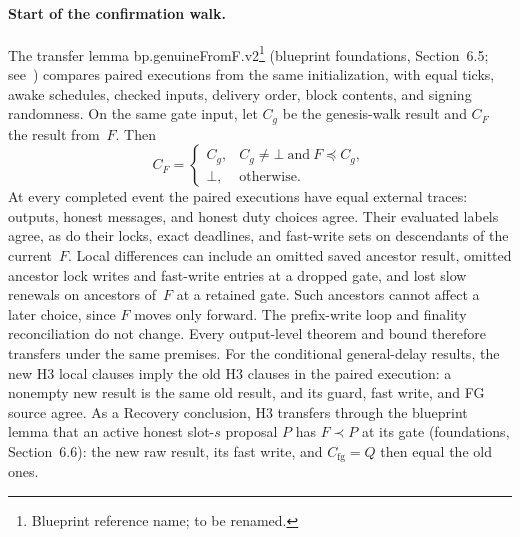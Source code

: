 \documentclass{article}
\theoremstyle{plain}
\theoremstyle{definition}
\theoremstyle{remark}
\begin{document}
\paragraph{Start of the confirmation walk.}
The transfer lemma \textsf{bp.genuineFromF.v2}\footnote{Blueprint reference name; to be renamed.} (blueprint foundations,
Section~6.5; see~\cite{BPO,GF208,GF208R}) compares paired executions
from the same initialization, with equal ticks, awake schedules, checked
inputs, delivery order, block contents, and signing randomness.
On the same gate input, let $C_g$ be the genesis-walk result and $C_F$
the result from~$F$.  Then
\[
 C_F=\begin{cases}
 C_g,&C_g\ne\bot\ \text{and}\ F\preceq C_g,\\
 \bot,&\text{otherwise}.
 \end{cases}
\]
At every completed event the paired executions have equal external
traces: outputs, honest messages, and honest duty choices agree.
Their evaluated labels agree, as do their locks, exact deadlines,
and fast-write sets on descendants of the current~$F$.
Local differences can include an omitted saved ancestor result,
omitted ancestor lock writes and fast-write entries at a dropped gate,
and lost slow renewals on ancestors of~$F$ at a retained gate.
Such ancestors cannot affect a later choice, since $F$ moves only
forward.  The prefix-write loop and finality reconciliation do not change.
Every output-level theorem and bound therefore transfers under the same
premises.  For the conditional general-delay results, the new H3 local
clauses imply the old H3 clauses in the paired execution: a nonempty
new result is the same old result, and its guard, fast write, and FG
source agree.  As a Recovery conclusion, H3 transfers through the
blueprint lemma that an active honest slot-$s$ proposal $P$ has
$F\prec P$ at its gate (foundations, Section~6.6): the new raw result,
its fast write, and $C_{\mathrm{fg}}=Q$ then equal the old ones.
\end{document}
